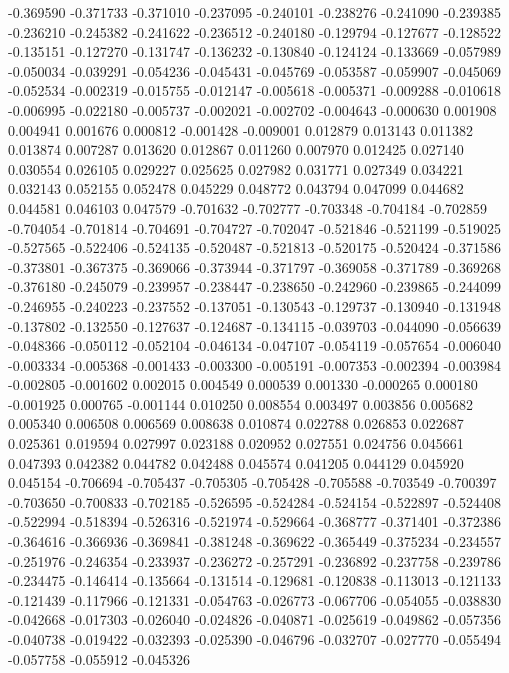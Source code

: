 -0.369590
-0.371733
-0.371010
-0.237095
-0.240101
-0.238276
-0.241090
-0.239385
-0.236210
-0.245382
-0.241622
-0.236512
-0.240180
-0.129794
-0.127677
-0.128522
-0.135151
-0.127270
-0.131747
-0.136232
-0.130840
-0.124124
-0.133669
-0.057989
-0.050034
-0.039291
-0.054236
-0.045431
-0.045769
-0.053587
-0.059907
-0.045069
-0.052534
-0.002319
-0.015755
-0.012147
-0.005618
-0.005371
-0.009288
-0.010618
-0.006995
-0.022180
-0.005737
-0.002021
-0.002702
-0.004643
-0.000630
0.001908
0.004941
0.001676
0.000812
-0.001428
-0.009001
0.012879
0.013143
0.011382
0.013874
0.007287
0.013620
0.012867
0.011260
0.007970
0.012425
0.027140
0.030554
0.026105
0.029227
0.025625
0.027982
0.031771
0.027349
0.034221
0.032143
0.052155
0.052478
0.045229
0.048772
0.043794
0.047099
0.044682
0.044581
0.046103
0.047579
-0.701632
-0.702777
-0.703348
-0.704184
-0.702859
-0.704054
-0.701814
-0.704691
-0.704727
-0.702047
-0.521846
-0.521199
-0.519025
-0.527565
-0.522406
-0.524135
-0.520487
-0.521813
-0.520175
-0.520424
-0.371586
-0.373801
-0.367375
-0.369066
-0.373944
-0.371797
-0.369058
-0.371789
-0.369268
-0.376180
-0.245079
-0.239957
-0.238447
-0.238650
-0.242960
-0.239865
-0.244099
-0.246955
-0.240223
-0.237552
-0.137051
-0.130543
-0.129737
-0.130940
-0.131948
-0.137802
-0.132550
-0.127637
-0.124687
-0.134115
-0.039703
-0.044090
-0.056639
-0.048366
-0.050112
-0.052104
-0.046134
-0.047107
-0.054119
-0.057654
-0.006040
-0.003334
-0.005368
-0.001433
-0.003300
-0.005191
-0.007353
-0.002394
-0.003984
-0.002805
-0.001602
0.002015
0.004549
0.000539
0.001330
-0.000265
0.000180
-0.001925
0.000765
-0.001144
0.010250
0.008554
0.003497
0.003856
0.005682
0.005340
0.006508
0.006569
0.008638
0.010874
0.022788
0.026853
0.022687
0.025361
0.019594
0.027997
0.023188
0.020952
0.027551
0.024756
0.045661
0.047393
0.042382
0.044782
0.042488
0.045574
0.041205
0.044129
0.045920
0.045154
-0.706694
-0.705437
-0.705305
-0.705428
-0.705588
-0.703549
-0.700397
-0.703650
-0.700833
-0.702185
-0.526595
-0.524284
-0.524154
-0.522897
-0.524408
-0.522994
-0.518394
-0.526316
-0.521974
-0.529664
-0.368777
-0.371401
-0.372386
-0.364616
-0.366936
-0.369841
-0.381248
-0.369622
-0.365449
-0.375234
-0.234557
-0.251976
-0.246354
-0.233937
-0.236272
-0.257291
-0.236892
-0.237758
-0.239786
-0.234475
-0.146414
-0.135664
-0.131514
-0.129681
-0.120838
-0.113013
-0.121133
-0.121439
-0.117966
-0.121331
-0.054763
-0.026773
-0.067706
-0.054055
-0.038830
-0.042668
-0.017303
-0.026040
-0.024826
-0.040871
-0.025619
-0.049862
-0.057356
-0.040738
-0.019422
-0.032393
-0.025390
-0.046796
-0.032707
-0.027770
-0.055494
-0.057758
-0.055912
-0.045326
